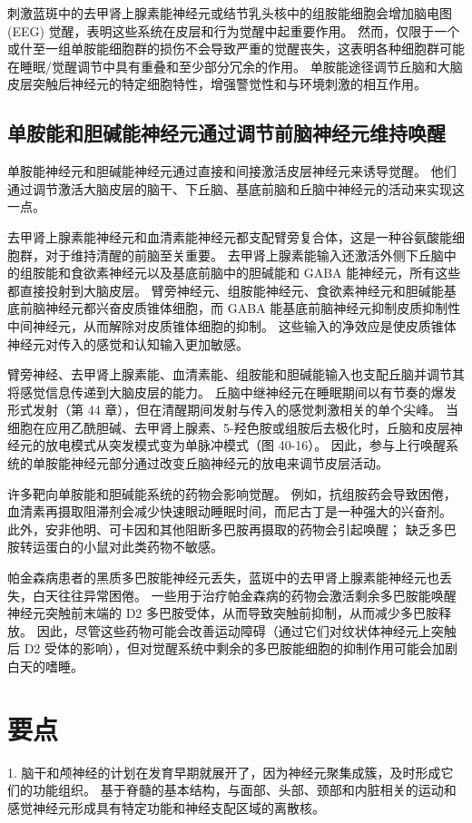 刺激蓝斑中的去甲肾上腺素能神经元或结节乳头核中的组胺能细胞会增加脑电图 (EEG) 觉醒，表明这些系统在皮层和行为觉醒中起重要作用。 然而，仅限于一个或什至一组单胺能细胞群的损伤不会导致严重的觉醒丧失，这表明各种细胞群可能在睡眠/觉醒调节中具有重叠和至少部分冗余的作用。 单胺能途径调节丘脑和大脑皮层突触后神经元的特定细胞特性，增强警觉性和与环境刺激的相互作用。

\subsection{单胺能和胆碱能神经元通过调节前脑神经元维持唤醒}

单胺能神经元和胆碱能神经元通过直接和间接激活皮层神经元来诱导觉醒。 他们通过调节激活大脑皮层的脑干、下丘脑、基底前脑和丘脑中神经元的活动来实现这一点。

去甲肾上腺素能神经元和血清素能神经元都支配臂旁复合体，这是一种谷氨酸能细胞群，对于维持清醒的前脑至关重要。 去甲肾上腺素能输入还激活外侧下丘脑中的组胺能和食欲素神经元以及基底前脑中的胆碱能和 GABA 能神经元，所有这些都直接投射到大脑皮层。 臂旁神经元、组胺能神经元、食欲素神经元和胆碱能基底前脑神经元都兴奋皮质锥体细胞，而 GABA 能基底前脑神经元抑制皮质抑制性中间神经元，从而解除对皮质锥体细胞的抑制。 这些输入的净效应是使皮质锥体神经元对传入的感觉和认知输入更加敏感。

臂旁神经、去甲肾上腺素能、血清素能、组胺能和胆碱能输入也支配丘脑并调节其将感觉信息传递到大脑皮层的能力。 丘脑中继神经元在睡眠期间以有节奏的爆发形式发射（第 44 章），但在清醒期间发射与传入的感觉刺激相关的单个尖峰。 当细胞在应用乙酰胆碱、去甲肾上腺素、5-羟色胺或组胺后去极化时，丘脑和皮层神经元的放电模式从突发模式变为单脉冲模式（图 40-16）。 因此，参与上行唤醒系统的单胺能神经元部分通过改变丘脑神经元的放电来调节皮层活动。

许多靶向单胺能和胆碱能系统的药物会影响觉醒。 例如，抗组胺药会导致困倦，血清素再摄取阻滞剂会减少快速眼动睡眠时间，而尼古丁是一种强大的兴奋剂。 此外，安非他明、可卡因和其他阻断多巴胺再摄取的药物会引起唤醒； 缺乏多巴胺转运蛋白的小鼠对此类药物不敏感。

帕金森病患者的黑质多巴胺能神经元丢失，蓝斑中的去甲肾上腺素能神经元也丢失，白天往往异常困倦。 一些用于治疗帕金森病的药物会激活剩余多巴胺能唤醒神经元突触前末端的 D2 多巴胺受体，从而导致突触前抑制，从而减少多巴胺释放。 因此，尽管这些药物可能会改善运动障碍（通过它们对纹状体神经元上突触后 D2 受体的影响），但对觉醒系统中剩余的多巴胺能细胞的抑制作用可能会加剧白天的嗜睡。

\section{要点}
1. 脑干和颅神经的计划在发育早期就展开了，因为神经元聚集成簇，及时形成它们的功能组织。 基于脊髓的基本结构，与面部、头部、颈部和内脏相关的运动和感觉神经元形成具有特定功能和神经支配区域的离散核。 

